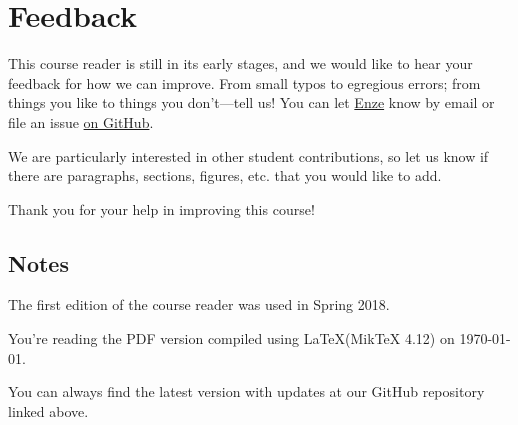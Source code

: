 

%

\chapter{Feedback} \label{ch:feedback}
\setlength{\parskip}{10pt}

This course reader is still in its early stages, and we would like to hear your feedback for how we can improve. 
From small typos to egregious errors; from things you like to things you don't---tell us!
You can let \href{mailto:enze@stanford.edu}{Enze} know by email or file an issue \href{https://github.com/Enze-Chen/mse_142_cr}{on GitHub}.

We are particularly interested in other student contributions, so let us know if there are paragraphs, sections, figures, etc. that you would like to add.

Thank you for your help in improving this course!


\section{Notes}

The first edition of the course reader was used in Spring 2018.

\noindent You're reading the PDF version compiled using \LaTeX (MikTeX 4.12) on \today.

\noindent You can always find the latest version with updates at our GitHub repository linked above.

%